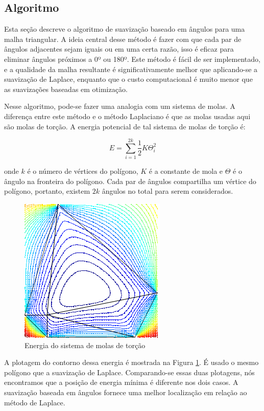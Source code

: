 \subsection{Algoritmo}
Esta seção descreve o algoritmo de suavização baseado em ângulos para uma malha triangular. A ideia central desse método é fazer com que cada par de ângulos adjacentes sejam iguais ou em uma certa razão, isso é eficaz para eliminar ângulos próximos a 0º ou 180º. Este método é fácil de ser implementado, e a qualidade da malha resultante é significativamente melhor que aplicando-se a suavização de Laplace, enquanto que o custo computacional é muito menor que as suavizações baseadas em otimização.

Nesse algoritmo, pode-se fazer uma analogia com um sistema de molas. A diferença entre este método e o método Laplaciano é que as molas usadas aqui são molas de torção. A energia potencial de tal sistema de molas de torção é:

\begin{equation*}
    E = \sum_{i=1}^{2k} \frac{1}{2} K \Theta_i^2
\end{equation*}

onde $k$ é o número de vértices do polígono, $K$ é a constante de mola e $\Theta$ é o ângulo na fronteira do polígono. Cada par de ângulos compartilha um vértice do polígono, portanto, existem $2k$ ângulos no total para serem considerados.

\begin{figure}[h]
    \centering
    \includegraphics{fig/contorno-mola-torcao.png}
    \caption{Energia do sistema de molas de torção}
    \label{fig:contorno-mola-torcao}
\end{figure}

A plotagem do contorno dessa energia é mostrada na Figura \ref{fig:contorno-mola-torcao}. É usado o mesmo polígono que a suavização de Laplace. Comparando-se essas duas plotagens, nós encontramos que a posição de energia mínima é diferente nos dois casos. A suavização baseada em ângulos fornece uma melhor localização em relação ao método de Laplace.


